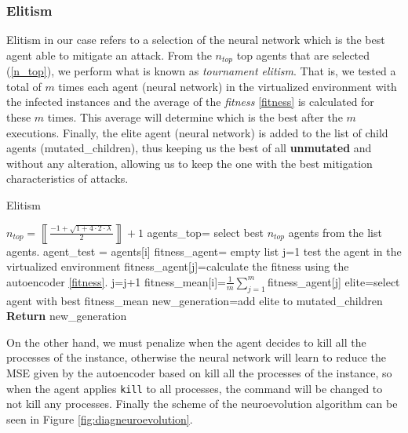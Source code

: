 \documentclass{iosart2c}
\begin{document}
\subsubsection{Elitism}

Elitism in our case refers to a selection of the neural network which is the best agent able to mitigate an attack. From the $n_{top}$ top agents that are selected (\ref{n_top}), we perform what is known as \textit{tournament elitism}. That is, we tested a total of $m$ times each agent (neural network) in the virtualized environment with the infected instances and the average of the \textit{fitness} \ref{fitness} is calculated for these $m$ times. This average will determine which is the best after the $m$ executions. Finally, the elite agent (neural network) is added to the list of child agents (mutated\_children), thus keeping us the best of all \textbf{unmutated} and without any alteration, allowing us to keep the one with the best mitigation characteristics of attacks. \\



\begin{algorithm}[h!]
\caption{Elitism}\label{elitismo}
\begin{algorithmic}[1]
\State $n_{top}=\left\llbracket\frac{-1+\sqrt{1+4\cdot2\cdot \lambda}}{2}\right\rrbracket+1$
\State agents\_top= select best $n_{top}$ agents from the list agents.
    \State agent\_test = agents[i]
    \State fitness\_agent= empty list
    \State j=1
    \Repeat
        \State test the agent in the virtualized environment
        \State fitness\_agent[j]=calculate the fitness using \State the autoencoder \ref{fitness}.
        \State j=j+1
\EndFor
\State fitness\_mean[i]=$\frac{1}{m}\sum^m_{j=1}$fitness\_agent[j]
\State elite=select agent with best fitness\_mean
\State new\_generation=add elite to mutated\_children
\State \textbf{Return} new\_generation
\EndFunction
\end{algorithmic}
\end{algorithm}

On the other hand, we must penalize when the agent decides to kill all the processes of the instance, otherwise the neural network will learn to reduce the MSE given by the autoencoder based on kill all the processes of the instance, so when the agent applies \texttt{kill} to all processes, the command will be changed to not kill any processes. Finally the scheme of the neuroevolution algorithm can be seen in Figure \ref{fig:diagneuroevolution}.
\end{document}
